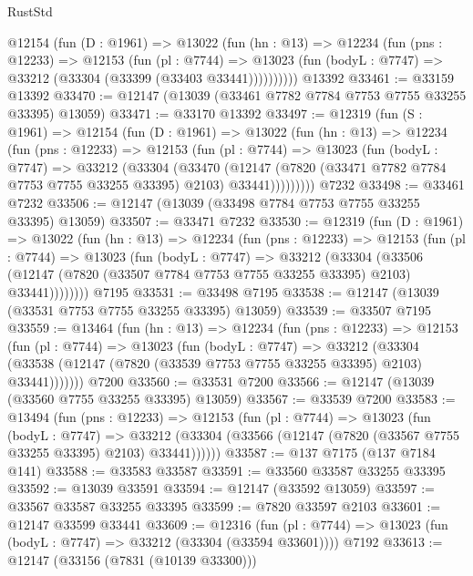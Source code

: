 \begin{lexlean}{RustStd}
\begin{coremodule}
      @12154
        (fun (D : @1961) =>
        @13022
          (fun (hn : @13) =>
          @12234
            (fun (pns : @12233) =>
            @12153
              (fun (pl : @7744) =>
              @13023 (fun (bodyL : @7747) => @33212 (@33304 (@33399 (@33403 @33441))))))))))
    @13392
@33461 := @33159 @13392
@33470 := @12147 (@13039 (@33461 @7782 @7784 @7753 @7755 @33255 @33395) @13059)
@33471 := @33170 @13392
@33497 := @12319
    (fun (S : @1961) =>
    @12154
      (fun (D : @1961) =>
      @13022
        (fun (hn : @13) =>
        @12234
          (fun (pns : @12233) =>
          @12153
            (fun (pl : @7744) =>
            @13023
              (fun (bodyL : @7747) =>
              @33212
                (@33304
                  (@33470
                    (@12147
                      (@7820 (@33471 @7782 @7784 @7753 @7755 @33255 @33395) @2103)
                      @33441)))))))))
    @7232
@33498 := @33461 @7232
@33506 := @12147 (@13039 (@33498 @7784 @7753 @7755 @33255 @33395) @13059)
@33507 := @33471 @7232
@33530 := @12319
    (fun (D : @1961) =>
    @13022
      (fun (hn : @13) =>
      @12234
        (fun (pns : @12233) =>
        @12153
          (fun (pl : @7744) =>
          @13023
            (fun (bodyL : @7747) =>
            @33212
              (@33304
                (@33506
                  (@12147 (@7820 (@33507 @7784 @7753 @7755 @33255 @33395) @2103) @33441))))))))
    @7195
@33531 := @33498 @7195
@33538 := @12147 (@13039 (@33531 @7753 @7755 @33255 @33395) @13059)
@33539 := @33507 @7195
@33559 := @13464
    (fun (hn : @13) =>
    @12234
      (fun (pns : @12233) =>
      @12153
        (fun (pl : @7744) =>
        @13023
          (fun (bodyL : @7747) =>
          @33212
            (@33304 (@33538 (@12147 (@7820 (@33539 @7753 @7755 @33255 @33395) @2103) @33441)))))))
    @7200
@33560 := @33531 @7200
@33566 := @12147 (@13039 (@33560 @7755 @33255 @33395) @13059)
@33567 := @33539 @7200
@33583 := @13494
    (fun (pns : @12233) =>
    @12153
      (fun (pl : @7744) =>
      @13023
        (fun (bodyL : @7747) =>
        @33212 (@33304 (@33566 (@12147 (@7820 (@33567 @7755 @33255 @33395) @2103) @33441))))))
@33587 := @137 @7175 (@137 @7184 @141)
@33588 := @33583 @33587
@33591 := @33560 @33587 @33255 @33395
@33592 := @13039 @33591
@33594 := @12147 (@33592 @13059)
@33597 := @33567 @33587 @33255 @33395
@33599 := @7820 @33597 @2103
@33601 := @12147 @33599 @33441
@33609 := @12316
    (fun (pl : @7744) => @13023 (fun (bodyL : @7747) => @33212 (@33304 (@33594 @33601))))
    @7192
@33613 := @12147 (@33156 (@7831 (@10139 @33300)))

\end{coremodule}
\end{lexlean}
